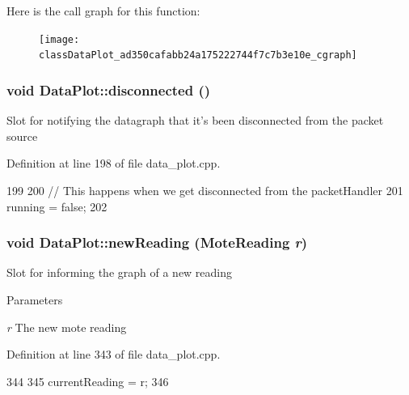 Here is the call graph for this function:\nopagebreak
\begin{figure}[H]
\begin{center}
\leavevmode
\texttt{[image: classDataPlot\_ad350cafabb24a175222744f7c7b3e10e\_cgraph]}
\end{center}
\end{figure}


\hypertarget{classDataPlot_a78920a414abdfa954fd34c662f39d09e}{
\subsubsection[{disconnected}]{\setlength{\rightskip}{0pt plus 5cm}void DataPlot::disconnected ()}}
\label{classDataPlot_a78920a414abdfa954fd34c662f39d09e}
Slot for notifying the datagraph that it's been disconnected from the packet source 

Definition at line 198 of file data\_\-plot.cpp.




\begin{DoxyCode}
199 {
200       // This happens when we get disconnected from the packetHandler
201       running = false;
202 }
\end{DoxyCode}


\hypertarget{classDataPlot_a36fe7e25f67a168d4f7dd2eaa2627003}{
\subsubsection[{newReading}]{\setlength{\rightskip}{0pt plus 5cm}void DataPlot::newReading ({\bf MoteReading} {\em r})}}
\label{classDataPlot_a36fe7e25f67a168d4f7dd2eaa2627003}
Slot for informing the graph of a new reading 
\begin{DoxyParams}{Parameters}
\item[{\em r}]The new mote reading \end{DoxyParams}


Definition at line 343 of file data\_\-plot.cpp.




\begin{DoxyCode}
344 {
345     currentReading = r;
346 }
\end{DoxyCode}




